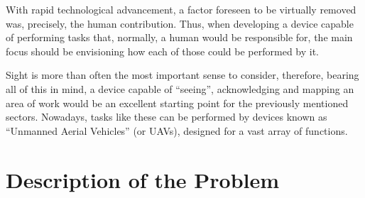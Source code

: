 With rapid technological advancement, a factor foreseen to be virtually removed was, precisely, the human contribution. Thus, when developing a device capable of performing tasks that, normally, a human would be responsible for, the main focus should be envisioning how each of those could be performed by it.

Sight is more than often the most important sense to consider, therefore, bearing all of this in mind, a device capable of ``seeing'', acknowledging and mapping an area of work would be an excellent starting point for the previously mentioned sectors. Nowadays, tasks like these can be performed by devices known as ``Unmanned Aerial Vehicles'' (or UAVs), designed for a vast array of functions.


\section{Description of the Problem}\label{sec:I_description}



